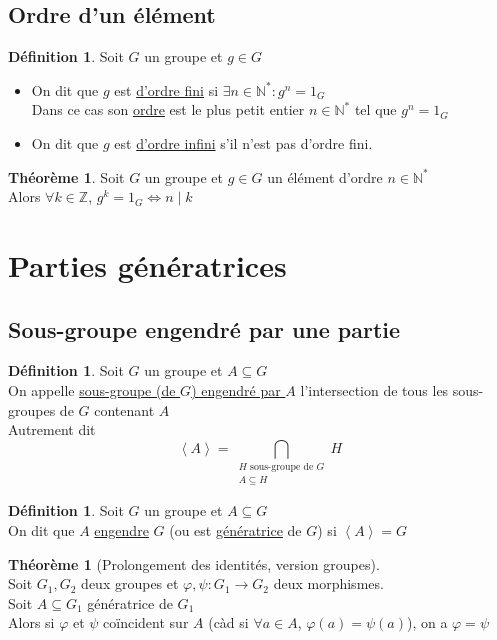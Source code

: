 \documentclass[10pt,a4paper]{article}
\theoremstyle{definition}
\newtheorem{theorem}[proposition]{Théorème}
\newtheorem{definition}[proposition]{Définition}
\begin{document}
\subsection{Ordre d'un élément}
\begin{definition}
Soit $G$ un groupe et $g \in G$
\begin{itemize}
\item On dit que $g$ est \uline{d'ordre fini} si $\exists n \in \mathbb{N}^*: g^n = 1_G$ \\
Dans ce cas son \uline{ordre} est le plus petit entier $n \in \mathbb{N}^*$ tel que $g^n = 1_G$
\item On dit que $g$ est \uline{d'ordre infini} s'il n'est pas d'ordre fini.
\end{itemize}
\end{definition}
\begin{theorem}
Soit $G$ un groupe et $g \in G$ un élément d'ordre $n \in \mathbb{N}^*$ \\
Alors $\forall k \in \mathbb{Z}$, $g^k = 1_G \iff n \mid k$
\end{theorem}

\section{Parties génératrices}
\subsection{Sous-groupe engendré par une partie}
\begin{definition}
Soit $G$ un groupe et $A \subseteq G$ \\
On appelle \uline{sous-groupe (de $G$) engendré par $A$} l'intersection de tous les sous-groupes de $G$ contenant $A$ \\
Autrement dit 
\[\left<A\right> = \bigcap\limits_{\substack{H \text{ sous-groupe de } G \\ A \subseteq H}} H\]
\end{definition}
\begin{definition}
Soit $G$ un groupe et $A \subseteq G$ \\
On dit que $A$ \uline{engendre} $G$ (ou est \uline{génératrice} de $G$) si $\left<A\right> = G$
\end{definition}
\begin{theorem}[Prolongement des identités, version groupes]
\hfill \\
Soit $G_1, G_2$ deux groupes et $\varphi, \psi : G_1 \to G_2$ deux morphismes. \\
Soit $A \subseteq G_1$ génératrice de $G_1$ \\
Alors si $\varphi$ et $\psi$ coïncident sur $A$ (càd si $\forall a \in A$, $\varphi(a) = \psi(a)$), on a $\varphi = \psi$
\end{theorem}
\end{document}
